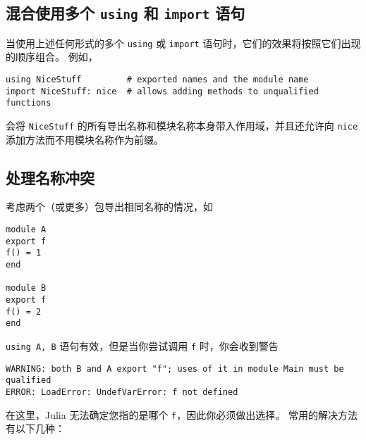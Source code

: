 \hypertarget{16794125395847682495}{}


\subsection{混合使用多个 \texttt{using} 和 \texttt{import} 语句}



当使用上述任何形式的多个 \texttt{using} 或 \texttt{import} 语句时，它们的效果将按照它们出现的顺序组合。 例如，




\begin{verbatim}
using NiceStuff         # exported names and the module name
import NiceStuff: nice  # allows adding methods to unqualified functions
\end{verbatim}



会将 \texttt{NiceStuff} 的所有导出名称和模块名称本身带入作用域，并且还允许向 \texttt{nice} 添加方法而不用模块名称作为前缀。



\hypertarget{1363363241812450828}{}


\subsection{处理名称冲突}



考虑两个（或更多）包导出相同名称的情况，如




\begin{verbatim}
module A
export f
f() = 1
end

module B
export f
f() = 2
end
\end{verbatim}



\texttt{using A, B} 语句有效，但是当你尝试调用 \texttt{f} 时，你会收到警告




\begin{verbatim}
WARNING: both B and A export "f"; uses of it in module Main must be qualified
ERROR: LoadError: UndefVarError: f not defined
\end{verbatim}



在这里，Julia 无法确定您指的是哪个 \texttt{f}，因此你必须做出选择。 常用的解决方法有以下几种：



